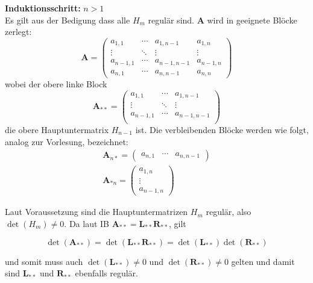 \documentclass[11pt]{article}
\theoremstyle{plain}
\theoremstyle{definition}
\let\mbb\boldsymbol
\renewcommand\boldsymbol{\mbb}
\renewcommand{\a}{\"{a}}
\renewcommand{\o}{\"{o}}
\begin{document}
\textbf{Induktionsschritt:} $n > 1$ \\
Es gilt aus der Bedigung dass alle $H_m$ regul\a r sind. $\mbb{A}$ wird in geeignete Bl\o cke zerlegt:
\begin{equation}
\mbb{A}=
\left(
\begin{array}{ccc|c}
a_{1,1} & \cdots & a_{1,n-1} 	 & a_{1,n} \\
\vdots  & \ddots & \vdots    	 & \vdots  \\
a_{n-1,1} & \cdots & a_{n-1,n-1} & a_{n-1,n} \\\hline
a_{n,1} & \cdots & a_{n,n-1} 	 & a_{n,n} 
\end{array}
\right)
\end{equation}
wobei der obere linke Block
\begin{equation}
\mbb{A}_{**} = 
\begin{pmatrix}
a_{1,1} & \cdots & a_{1,n-1}    \\
\vdots  & \ddots & \vdots       \\
a_{n-1,1} & \cdots & a_{n-1,n-1}\\
\end{pmatrix}
\end{equation}
die obere Hauptuntermatrix $H_{n-1}$ ist. Die verbleibenden Bl\o cke werden wie folgt, analog zur Vorlesung, bezeichnet:
\begin{align}
\mbb{A}_{n*} =
\begin{pmatrix}
a_{n,1} & \cdots & a_{n,n-1}
\end{pmatrix}\\
\mbb{A}_{*n} = 
\begin{pmatrix}
a_{1,n} \\
\vdots  \\
a_{n-1,n} 
\end{pmatrix}
\end{align}

Laut Voraussetzung sind die Hauptuntermatrizen $H_m$ regul\a r, also $\det(H_m) \neq 0$. Da laut IB $\mbb{A}_{**} = \mbb{L}_{**}\mbb{R}_{**}$, gilt 

\begin{equation}
\det(\mbb{A}_{**}) = \det(\mbb{L}_{**}\mbb{R}_{**}) = \det(\mbb{L}_{**}) \det(\mbb{R}_{**}) 
\end{equation}

und somit muss auch $\det(\mbb{L}_{**}) \neq 0$ und $\det (\mbb{R}_{**}) \neq 0$ gelten und damit sind $\mbb{L}_{**}$ und $\mbb{R}_{**}$ ebenfalls regul\a r.
\end{document}
